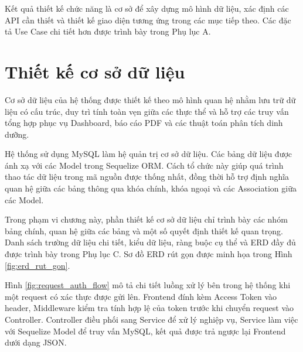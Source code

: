 \documentclass[12pt, a4paper]{report}
\begin{document}
Kết quả thiết kế chức năng là cơ sở để xây dựng mô hình dữ liệu, xác định các API cần thiết và thiết kế giao diện tương ứng trong các mục tiếp theo. Các đặc tả Use Case chi tiết hơn được trình bày trong Phụ lục A.

\section{Thiết kế cơ sở dữ liệu}Cơ sở dữ liệu của hệ thống được thiết kế theo mô hình quan hệ nhằm lưu trữ dữ liệu có cấu trúc, duy trì tính toàn vẹn giữa các thực thể và hỗ trợ các truy vấn tổng hợp phục vụ Dashboard, báo cáo PDF và các thuật toán phân tích dinh dưỡng.

Hệ thống sử dụng MySQL làm hệ quản trị cơ sở dữ liệu. Các bảng dữ liệu được ánh xạ với các Model trong Sequelize ORM. Cách tổ chức này giúp quá trình thao tác dữ liệu trong mã nguồn được thống nhất, đồng thời hỗ trợ định nghĩa quan hệ giữa các bảng thông qua khóa chính, khóa ngoại và các Association giữa các Model.

Trong phạm vi chương này, phần thiết kế cơ sở dữ liệu chỉ trình bày các nhóm bảng chính, quan hệ giữa các bảng và một số quyết định thiết kế quan trọng. Danh sách trường dữ liệu chi tiết, kiểu dữ liệu, ràng buộc cụ thể và ERD đầy đủ được trình bày trong Phụ lục C. Sơ đồ ERD rút gọn được minh họa trong Hình \ref{fig:erd_rut_gon}.

Hình \ref{fig:request_auth_flow} mô tả chi tiết luồng xử lý bên trong hệ thống khi một request có xác thực được gửi lên. Frontend đính kèm Access Token vào header, Middleware kiểm tra tính hợp lệ của token trước khi chuyển request vào Controller. Controller điều phối sang Service để xử lý nghiệp vụ, Service làm việc với Sequelize Model để truy vấn MySQL, kết quả được trả ngược lại Frontend dưới dạng JSON.
\end{document}
